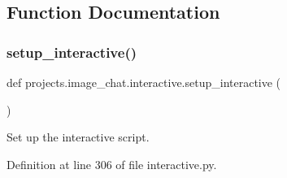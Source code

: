 \subsection{Function Documentation}
\mbox{\label{namespaceprojects_1_1image__chat_1_1interactive_a44c69eb8136c100209f99644e41407b0}} 
\subsubsection{\texorpdfstring{setup\+\_\+interactive()}{setup\_interactive()}}
{\footnotesize\ttfamily def projects.\+image\+\_\+chat.\+interactive.\+setup\+\_\+interactive (\begin{DoxyParamCaption}{ }\end{DoxyParamCaption})}

\begin{DoxyVerb}Set up the interactive script.
\end{DoxyVerb}
 

Definition at line 306 of file interactive.\+py.


